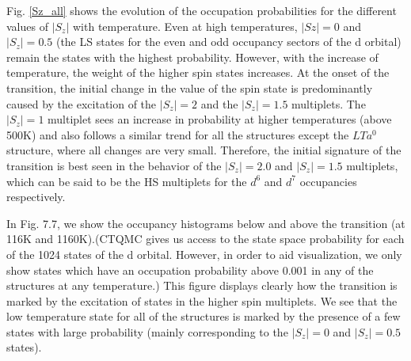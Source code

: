 \documentclass[10pt]{ruthesis}
\begin{document}
{Fig. \ref{Sz_all} shows the evolution of the occupation probabilities for the different values of $|S_z|$ with temperature. Even at high temperatures, $|Sz|=0$ and $|S_z|=0.5$ (the LS states for the even and odd occupancy sectors of the d orbital) remain the states with the highest probability. However, with the increase of temperature, the weight of the higher spin states increases. 
%
 At the onset of the transition, the initial change in the value of the spin state is predominantly caused by the excitation of the $|S_z|=2$ and the $|S_z|=1.5$ multiplets.  
The $|S_z|=1$ multiplet sees an increase in probability at higher temperatures (above 500K) and also follows a similar trend for all the structures except the $LTa^0$ structure, where all changes are very small. Therefore, the initial signature of the transition is best seen in the behavior of the $|S_z|=2.0$ and $|S_z|=1.5$ multiplets, which can be said to be the HS multiplets for the $d^6$ and $d^7$ occupancies respectively. 

In Fig. 7.7, we show the occupancy histograms below and above the transition (at 116K and 1160K).(CTQMC gives us access to the state space probability for each of the 1024 states of the d orbital. However, in order to aid visualization, we only show states which have an occupation probability above 0.001 in any of the structures at any temperature.) This figure displays clearly how the transition is marked by the excitation of states in the higher spin multiplets. We see that the low temperature state for all of the structures is marked by the presence of a few states with large probability (mainly corresponding to the $|S_z|=0$ and $|S_z|=0.5$ states). 

}
\end{document}
